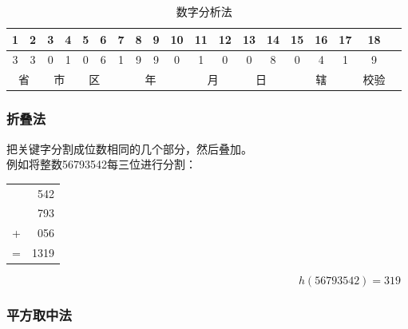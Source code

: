 \begin{table}[H]
	\centering
	\begin{tabular}{|c|c|c|c|c|c|c|c|c|c|c|c|c|c|c|c|c|c|c|}
		\hline
		\textbf{1}               & \textbf{2}               & \textbf{3}               & \textbf{4}               & \textbf{5}               & \textbf{6}               & \textbf{7}               & \textbf{8} & \textbf{9} & \textbf{10} & \textbf{11} & \textbf{12} & \textbf{13} & \textbf{14} & \textbf{15} & \textbf{16} & \textbf{17} & \textbf{18} \\
		\hline
		3                        & 3                        & 0                        & 1                        & 0                        & 6                        & 1                        & 9          & 9          & 0           & 1           & 0           & 0           & 8           & 0           & 4           & 1           & 9           \\
		\hline
		\multicolumn{2}{|c|}{省} & \multicolumn{2}{|c|}{市} & \multicolumn{2}{|c|}{区} & \multicolumn{4}{|c|}{年} & \multicolumn{2}{|c|}{月} & \multicolumn{2}{|c|}{日} & \multicolumn{3}{|c|}{辖} & 校验                                                                                                                                                  \\
		\hline
	\end{tabular}
	\caption{数字分析法}
\end{table}

\subsubsection{折叠法}

把关键字分割成位数相同的几个部分，然后叠加。 \\

例如将整数56793542每三位进行分割：

\begin{table}[H]
	\centering
	\begin{tabular}{cD{.}{.}{3}}
		  & 542  \\
		  & 793  \\
		+ & 056  \\
		\hline
		= & 1319
	\end{tabular}
\end{table}

\vspace{-1cm}

$$
	h(56793542) = 319
$$

\subsubsection{平方取中法}

